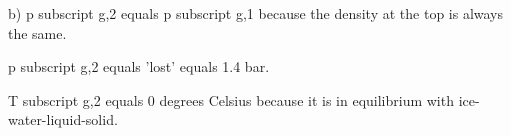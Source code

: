 b) p subscript g,2 equals p subscript g,1 because the density at the top is always the same.

p subscript g,2 equals 'lost' equals 1.4 bar.

T subscript g,2 equals 0 degrees Celsius because it is in equilibrium with ice-water-liquid-solid.